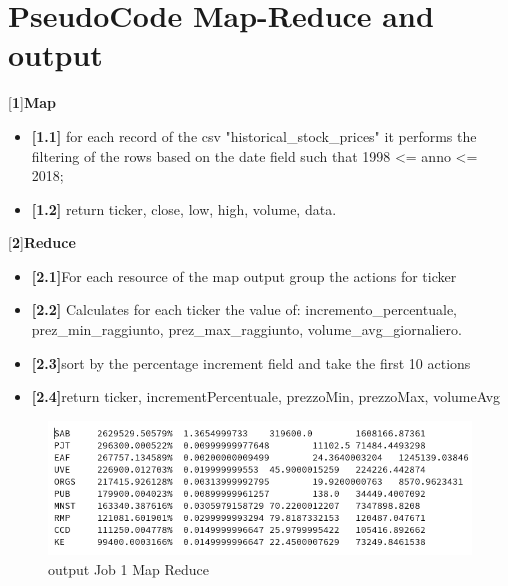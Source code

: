 \documentclass[]{report}
\begin{document}
\section*{PseudoCode Map-Reduce and output}
[\textbf{1}]\textbf{Map}\begin{itemize}
	\item \textbf{[1.1]} for each record of the csv "historical\_stock\_prices" it performs the filtering of the rows based on the date field such that 1998 <= anno <= 2018;
	\item \textbf{[1.2]} return ticker, close, low, high, volume, data.	
\end{itemize}
[\textbf{2}]\textbf{Reduce} \begin{itemize}
	\item \textbf{[2.1]}For each resource of the map output group the actions for ticker
	\item \textbf{[2.2]} Calculates for each ticker the value of: incremento\_percentuale, prez\_min\_raggiunto, prez\_max\_raggiunto, volume\_avg\_giornaliero.
	\item \textbf{[2.3]}sort by the percentage increment field and take the first 10 actions
	\item \textbf{[2.4]}return ticker, incrementPercentuale, prezzoMin, prezzoMax, volumeAvg
\end{itemize}
\newpage
\begin{center}
	\begin{figure}[!htb]
		\hspace{-1 cm}
		\includegraphics[width=1.2 \linewidth]{figure/output1map}
		\caption{output Job 1 Map Reduce}
	\end{figure}
\end{center}
\end{document}
